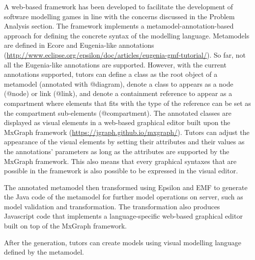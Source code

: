 \documentclass[conference]{IEEEtran}
\begin{document}
A web-based framework has been developed to facilitate the development of software modelling games in line with the concerns discussed in the Problem Analysis section. The framework implements a metamodel-annotation-based approach for defining the concrete syntax of the modelling language. Metamodels are defined in Ecore \cite{steinberg2008emf} and Eugenia-like annotations \cite{kolovos2015eugenia}(\url{http://www.eclipse.org/epsilon/doc/articles/eugenia-gmf-tutorial/}). So far, not all the Eugenia-like annotations are supported. However, with the current annotations supported, tutors can define a class as the root object of a metamodel (annotated with {\selectfont @diagram}), denote a class to appears as a node ({\selectfont @node}) or link ({\selectfont @link}), and denote a containment reference to appear as a compartment where elements that fits with the type of the reference can be set as the compartment sub-elements ({\selectfont @compartment}). The annotated classes are displayed as visual elements in a web-based graphical editor built upon the MxGraph framework (\url{https://jgraph.github.io/mxgraph/}). Tutors can adjust the appearance of the visual elements by setting their attributes and their values as the annotations' parameters as long as the attributes are supported by the MxGraph framework. This also means that every graphical syntaxes that are possible in the framework is also possible to be expressed in the visual editor.   


The annotated metamodel then transformed using Epsilon \cite{kolovos2010epsilon} and EMF \cite{steinberg2008emf} to generate the Java code of the metamodel for further model operations on server, such as model validation and transformation. The transformation also produces Javascript code that implements a language-specific web-based graphical editor built on top of the MxGraph framework. 

After the generation, tutors can create models using visual modelling language defined by the metamodel.
\end{document}
